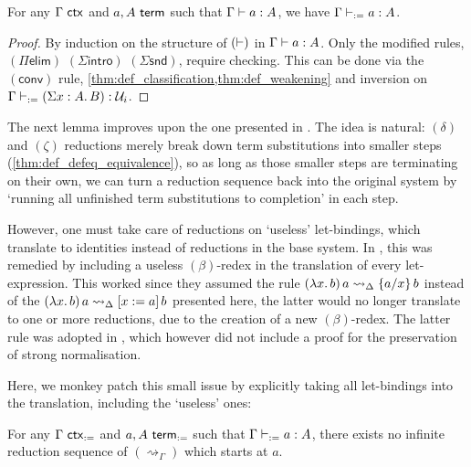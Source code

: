 \documentclass[twoside]{report}
\begin{document}
\begin{proposition}[Completeness]
\label{thm:def_completeness}
For any $\Gamma \ctxo$ and $a, A \termo$ such that $\Gamma \vdasho a : A$, we have $\Gamma \vdashd a : A$.
\end{proposition}

\begin{proof}
By induction on the structure of $(\vdasho)$ in $\Gamma \vdasho a : A$. Only the modified rules, $(\Pi\mathsf{elim})$ $(\Sigma\mathsf{intro})$ $(\Sigma\mathsf{snd})$, require checking. This can be done via the $(\mathsf{conv})$ rule, \cref{thm:def_classification,thm:def_weakening} and inversion on $\Gamma \vdashd (\sig x A B) : \mathcal U_i$.
\end{proof}

The next lemma improves upon the one presented in \cite{severi1994pure}. The idea is natural: $(\delta)$ and $(\zeta)$ reductions merely break down term substitutions into smaller steps (\cref{thm:def_defeq_equivalence}), so as long as those smaller steps are terminating on their own, we can turn a reduction sequence back into the original system by `running all unfinished term substitutions to completion' in each step.

However, one must take care of reductions on `useless' let-bindings, which translate to identities instead of reductions in the base system. In \cite{severi1994pure}, this was remedied by including a useless $(\beta)$-redex in the translation of every let-expression. This worked since they assumed the rule $\app {(\lam x b)} a \rightsquigarrow_\Delta \subst x a b$ instead of the $\app {(\lam x b)} a \rightsquigarrow_\Delta \llet x a b$ presented here, the latter would no longer translate to one or more reductions, due to the creation of a new $(\beta)$-redex. The latter rule was adopted in \cite{mcbride2000dependently}, which however did not include a proof for the preservation of strong normalisation.

Here, we monkey patch this small issue by explicitly taking all let-bindings into the translation, including the `useless' ones:

\begin{proposition}
\label{thm:def_red_termination}
For any $\Gamma \ctxd$ and $a,A \termd$ such that $\Gamma \vdashd a : A$, there exists no infinite reduction sequence of $(\rightsquigarrow_\Gamma)$ which starts at $a$.
\end{proposition}
\end{document}
